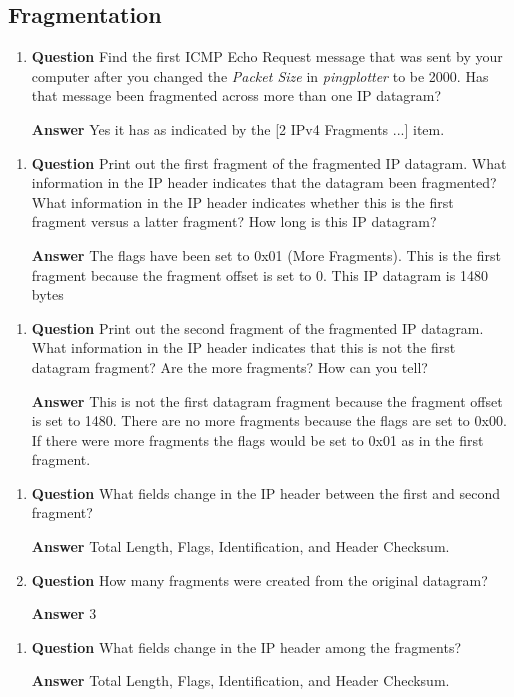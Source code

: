 \documentclass[12pt,letterpaper]{article}
\newcommand{\q}{\textbf{Question} }
\newcommand{\ans}{\textbf{Answer} }
\begin{document}
\pagebreak
\subsection*{Fragmentation}
\begin{enumerate}[resume]
\item \q
Find the first ICMP Echo Request message that was sent by your computer after
you changed the \emph{Packet Size} in \emph{pingplotter} to be 2000. Has that message been
fragmented across more than one IP datagram?

\ans Yes it has as indicated by the [2 IPv4 Fragments ...] item.
\end{enumerate}



\pagebreak
\begin{enumerate}[resume]
\item \q
Print out the first fragment of the fragmented IP datagram. What information in
the IP header indicates that the datagram been fragmented? What information in
the IP header indicates whether this is the first fragment versus a latter fragment?
How long is this IP datagram?

\ans The flags have been set to 0x01 (More Fragments). This is
the first fragment because the fragment offset is set to 0. This IP datagram
is 1480 bytes
\end{enumerate}



\pagebreak
\begin{enumerate}[resume]
\item \q
Print out the second fragment of the fragmented IP datagram. What information in
the IP header indicates that this is not the first datagram fragment? Are the more
fragments? How can you tell?

\ans This is not the first datagram fragment because the fragment
offset is set to 1480. There are no more fragments because the flags are set to
0x00. If there were more fragments the flags would be set to 0x01 as in the
first fragment.
\end{enumerate}



\pagebreak
\begin{enumerate}[resume]
\item \q
What fields change in the IP header between the first and second fragment?

\ans Total Length, Flags, Identification, and Header Checksum.

\item \q
How many fragments were created from the original datagram?

\ans 3
\end{enumerate}





\begin{enumerate}[resume]
\item \q
What fields change in the IP header among the fragments?

\ans Total Length, Flags, Identification, and Header Checksum.
\end{enumerate}
\end{document}
